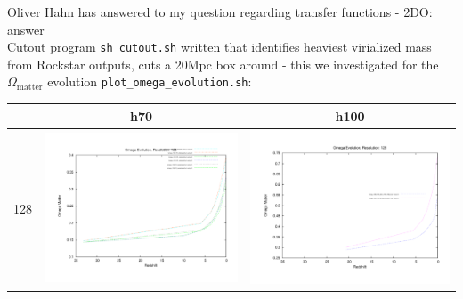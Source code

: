 \begin{itemize}
Oliver Hahn has answered to my question regarding transfer functions - 2DO: answer \\
Cutout program \texttt{sh cutout.sh} written that identifies heaviest virialized mass 
from Rockstar outputs, cuts a 20Mpc box around -  this we investigated 
for the $ \Omega_{\text{matter}}$ evolution \texttt{plot\_omega\_evolution.sh}: 

\begin{table}
\begin{tabular}{l|c|c}
 & h70 & h100 \\
\hline 
 128 & \includegraphics[scale=0.2]{analysis/omega_evolution/omega_evolution_128_h70.pdf} & \includegraphics[scale=0.2]{analysis/omega_evolution/omega_evolution_128_h100.pdf} \\

\end{tabular}
\end{table}
\end{itemize}

